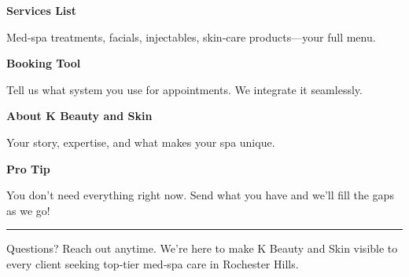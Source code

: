 \documentclass[11pt,letterpaper]{article}
\begin{document}
\begin{minipage}[t]{0.48\textwidth}
\begin{tcolorbox}[colframe=accent-teal, boxrule=1pt, left=0.7em, right=0.7em, top=0.5em, bottom=0.5em, arc=4pt, boxsep=0pt]
{\bfseries\small\color{accent-teal}Services List}

\vspace{0.15em}

{\small Med‑spa treatments, facials, injectables, skin‑care products—your full menu.}
\end{tcolorbox}

\vspace{0.1em}

\begin{tcolorbox}[colframe=accent-teal, boxrule=1pt, left=0.7em, right=0.7em, top=0.5em, bottom=0.5em, arc=4pt, boxsep=0pt]
{\bfseries\small\color{accent-teal}Booking Tool}

\vspace{0.15em}

{\small Tell us what system you use for appointments. We integrate it seamlessly.}
\end{tcolorbox}

\vspace{0.1em}

\begin{tcolorbox}[colframe=accent-teal, boxrule=1pt, left=0.7em, right=0.7em, top=0.5em, bottom=0.5em, arc=4pt, boxsep=0pt]
{\bfseries\small\color{accent-teal}About K Beauty and Skin}

\vspace{0.15em}

{\small Your story, expertise, and what makes your spa unique.}
\end{tcolorbox}

\vspace{-0.2em}
\end{minipage}

\vspace{0.15em}

\begin{tcolorbox}[colback={accent-red!5}, colframe=accent-red!20, boxrule=0.5pt, left=0.7em, right=0.7em, top=0.4em, bottom=0.4em, arc=6pt, boxsep=0pt]

{\bfseries\small\color{accent-red}Pro Tip}

\vspace{0.1em}

{\small You don't need everything right now. Send what you have and we'll fill the gaps as we go!}

\end{tcolorbox}

\vspace{0.15em}

\noindent\hrule
\vspace{0.2em}

{\small\color{text-light}Questions? Reach out anytime. We're here to make K Beauty and Skin visible to every client seeking top‑tier med‑spa care in Rochester Hills.}
\end{document}
